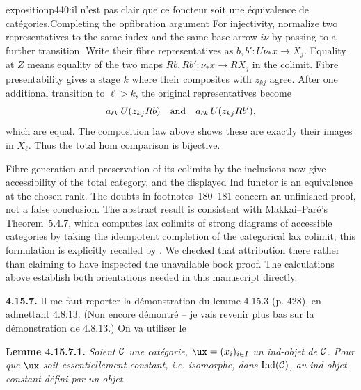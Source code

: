 \begin{dcomment}{exposition}{p440:il n'est pas clair que ce foncteur soit une équivalence de catégories.}{Completing the opfibration argument}
For injectivity, normalize two representatives to the same index and the same base arrow $i\nu$ by passing to a further transition. Write their fibre representatives as $b,b':U\nu_*x\to X_j$. Equality at $Z$ means equality of the two maps $Rb,Rb':\nu_*x\to RX_j$ in the colimit. Fibre presentability gives a stage $k$ where their composites with $z_{kj}$ agree. After one additional transition to $\ell>k$, the original representatives become
\[
 a_{\ell k}\,U(z_{kj}Rb)
 \quad\hbox{and}\quad
 a_{\ell k}\,U(z_{kj}Rb'),
\]
which are equal. The composition law above shows these are exactly their images in $X_\ell$. Thus the total hom comparison is bijective.

Fibre generation and preservation of its colimits by the inclusions now give accessibility of the total category, and the displayed Ind functor is an equivalence at the chosen rank. The doubts in footnotes~180--181 concern an unfinished proof, not a false conclusion. The abstract result is consistent with Makkai--Par\'e's Theorem~5.4.7, which computes lax colimits of strong diagrams of accessible categories by taking the idempotent completion of the categorical lax colimit; this formulation is explicitly recalled by \citet[Introduction]{PareRosicky2013}. We checked that attribution there rather than claiming to have inspected the unavailable book proof. The calculations above establish both orientations needed in this manuscript directly.
\end{dcomment}


\textbf{4.15.7.} Il me faut reporter la démonstration du lemme 4.15.3 (p. 428), en admettant 4.8.13. (Non encore démontré -- je vais revenir plus bas sur la démonstration de 4.8.13.) On va utiliser le

\textbf{Lemme 4.15.7.1.} \textit{Soient $\mathcal{C}$ une catégorie, $\ux = (x_i)_{i\in I}$ un ind-objet de $\mathcal{C}$. Pour que $\ux$ soit essentiellement constant, i.e. isomorphe, dans} $\operatorname{Ind}(\mathcal{C})$\textit{, au ind-objet constant défini par un objet}

